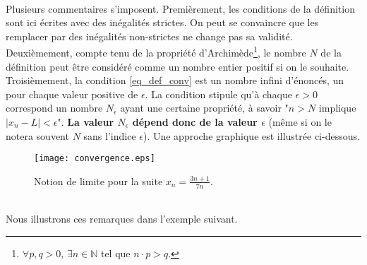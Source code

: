 \documentclass[oneside,11pt,french,table]{book}
\theoremstyle{definition}
\theoremstyle{plain}
\theoremstyle{remark}
\begin{document}
\paragraph{}
\indent Plusieurs commentaires s'imposent.  
Premièrement, les conditions de la définition sont ici écrites avec des inégalités strictes. On peut se convaincre que les remplacer par des inégalités non-strictes ne change pas sa validité. \\
Deuxièmement, compte tenu de la propriété d'Archimède\footnote{ $\forall p,q > 0, \, \exists n \in \mathbb{N}$ tel que $n \cdot p > q$.}, le nombre $N$ de la définition peut être considéré comme un nombre entier positif si on le souhaite. \\
Troisièmement, la condition \textcolor{blue}{\eqref{eq_def_conv}} est un nombre infini d'énoncés, un pour chaque valeur positive de $\epsilon$. La condition stipule qu'à chaque $\epsilon>0$ correspond un nombre $N_\epsilon$ ayant une certaine propriété, à savoir "$n>N$ implique $|x_n-L|<\epsilon$". \textbf{La valeur $N_\epsilon$ dépend donc de la valeur $\epsilon$} (même si on le notera souvent $N$ sans l'indice $\epsilon$). Une approche graphique est illustrée ci-dessous.
 \begin{figure}[htb]
        \centering
        \texttt{[image: convergence.eps]}
        \caption{Notion de limite pour la suite $x_n=\frac{3n+1}{7n}$.}
        \label{fig:conv}
    \end{figure}\\ Nous illustrons ces remarques dans l'exemple suivant.
\end{document}
